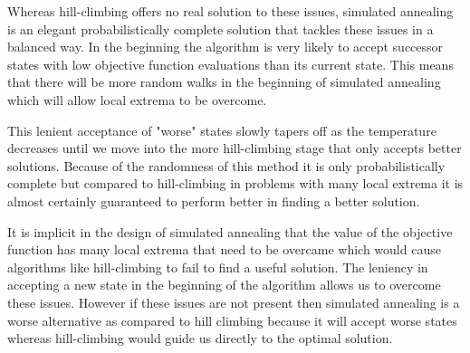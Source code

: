 \documentclass[10pt,a4paper]{article}
\begin{document}
\begin{enumerate}[A.]
		Whereas hill-climbing offers no real solution to these issues, simulated annealing is an elegant probabilistically complete solution that tackles these issues in a balanced way. In the beginning the algorithm is very likely to accept successor states with low objective function evaluations than its current state. This means that there will be more random walks in the beginning of simulated annealing which will allow local extrema to be overcome.
		
		This lenient acceptance of "worse" states slowly tapers off as the temperature decreases until we move into the more hill-climbing stage that only accepts better solutions. Because of the randomness of this method it is only probabilistically complete but compared to hill-climbing in problems with many local extrema it is almost certainly guaranteed to perform better in finding a better solution.
		
		It is implicit in the design of simulated annealing that the value of the objective function has many local extrema that need to be overcame which would cause algorithms like hill-climbing to fail to find a useful solution. The leniency in accepting a new state in the beginning of the algorithm allows us to overcome these issues. However if these issues are not present then simulated annealing is a worse alternative as compared to hill climbing because it will accept worse states whereas hill-climbing would guide us directly to the optimal solution.
		
	\end{enumerate}
	
\end{document}
